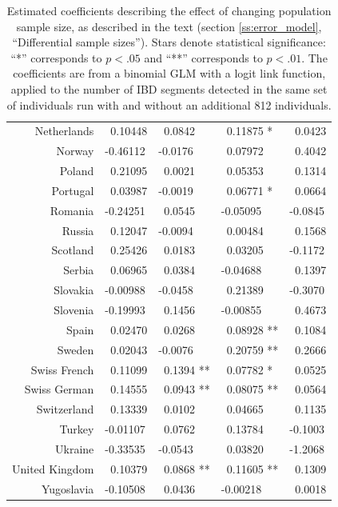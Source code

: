 \documentclass{article}
\begin{document}
\begin{table}[!htp]
\begin{center}
\begin{tabular}{|r|llll|}
  Netherlands & ~0.10448    & ~0.0842    & ~0.11875 *  & ~0.0423    \\ 
  Norway & -0.46112    & -0.0176    & ~0.07972    & ~0.4042    \\ 
  Poland & ~0.21095    & ~0.0021    & ~0.05353    & ~0.1314    \\ 
  Portugal & ~0.03987    & -0.0019    & ~0.06771 *  & ~0.0664    \\ 
  Romania & -0.24251    & ~0.0545    & -0.05095    & -0.0845    \\ 
  Russia & ~0.12047    & -0.0094    & ~0.00484    & ~0.1568    \\ 
  Scotland & ~0.25426    & ~0.0183    & ~0.03205    & -0.1172    \\ 
  Serbia & ~0.06965    & ~0.0384    & -0.04688    & ~0.1397    \\ 
  Slovakia & -0.00988    & -0.0458    & ~0.21389    & -0.3070    \\ 
  Slovenia & -0.19993    & ~0.1456    & -0.00855    & ~0.4673    \\ 
  Spain & ~0.02470    & ~0.0268    & ~0.08928 ** & ~0.1084    \\ 
  Sweden & ~0.02043    & -0.0076    & ~0.20759 ** & ~0.2666    \\ 
  Swiss French & ~0.11099    & ~0.1394 ** & ~0.07782 *  & ~0.0525    \\ 
  Swiss German & ~0.14555    & ~0.0943 ** & ~0.08075 ** & ~0.0564    \\ 
  Switzerland & ~0.13339    & ~0.0102    & ~0.04665    & ~0.1135    \\ 
  Turkey & -0.01107    & ~0.0762    & ~0.13784    & -0.1003    \\ 
  Ukraine & -0.33535    & -0.0543    & ~0.03820    & -1.2068    \\ 
  United Kingdom & ~0.10379    & ~0.0868 ** & ~0.11605 ** & ~0.1309    \\ 
  Yugoslavia & -0.10508    & ~0.0436    & -0.00218    & ~0.0018    \\ 
   \hline
\end{tabular}
\end{center}
\caption{
Estimated coefficients describing the effect of changing population sample size,
as described in the text (section \ref{ss:error_model}, ``Differential sample sizes'').
Stars denote statistical significance: ``*'' corresponds to $p<.05$ and ``**'' corresponds to $p<.01$.
The coefficients are from a binomial GLM with a logit link function,
applied to the number of IBD segments detected in the same set of individuals run with and without an additional 812 individuals.
}
\end{table}
\end{document}
